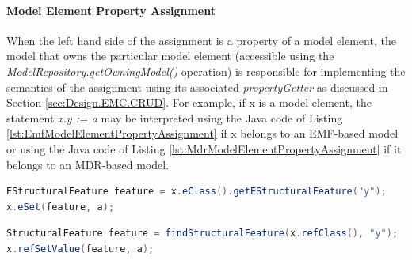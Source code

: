 \paragraph{Model Element Property Assignment}

When the left hand side of the assignment is a property of a model element, the model that owns the particular model element (accessible using the \emph{ModelRepository.getOwningModel() }operation) is responsible for implementing the semantics of the assignment using its associated \emph{propertyGetter} as discussed in Section \ref{sec:Design.EMC.CRUD}. For example, if x is a model element, the statement \emph{x.y := a} may be interpreted using the Java code of Listing \ref{lst:EmfModelElementPropertyAssignment} if x belongs to an EMF-based model or using the Java code of Listing \ref{lst:MdrModelElementPropertyAssignment} if it belongs to an MDR-based model.

\begin{lstlisting}[basicstyle=\ttfamily\footnotesize, flexiblecolumns=true, numbers=none, nolol=true, caption=Java code that assigns the value of a property of a model element that belongs to an EMF-based model, label=lst:EmfModelElementPropertyAssignment, numbers=left, language=Java, tabsize=2]
EStructuralFeature feature = x.eClass().getEStructuralFeature("y");
x.eSet(feature, a);
\end{lstlisting}

\begin{lstlisting}[basicstyle=\ttfamily\footnotesize, flexiblecolumns=true, numbers=none, nolol=true, caption=Java code that assigns the value of a property of a model element that belongs to an MDR-based model, label=lst:MdrModelElementPropertyAssignment, numbers=left, language=Java, tabsize=2]
StructuralFeature feature = findStructuralFeature(x.refClass(), "y");
x.refSetValue(feature, a);
\end{lstlisting}


